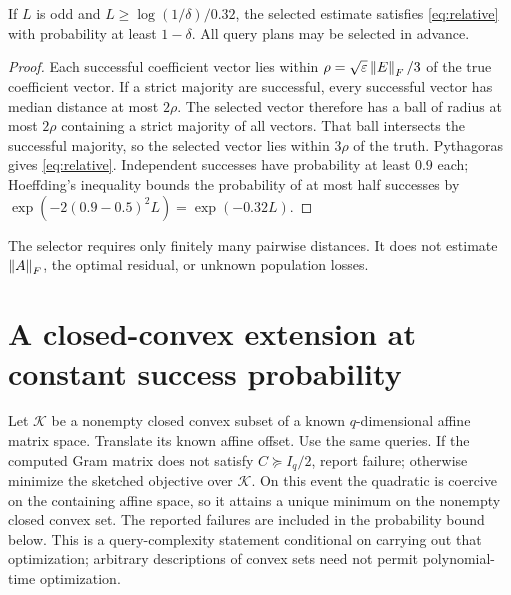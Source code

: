 \documentclass[11pt]{article}
\begin{document}
\begin{proposition}\label{prop:amplification}
If $L$ is odd and $L\ge\log(1/\delta)/0.32$, the selected estimate satisfies \eqref{eq:relative} with probability at least $1-\delta$. All query plans may be selected in advance.
\end{proposition}
\begin{proof}
Each successful coefficient vector lies within
$\rho=\sqrt{\varepsilon}\left\lVert E\right\rVert_F/3$ of the true coefficient vector. If a strict majority are successful, every successful vector has median distance at most $2\rho$. The selected vector therefore has a ball of radius at most $2\rho$ containing a strict majority of all vectors. That ball intersects the successful majority, so the selected vector lies within $3\rho$ of the truth. Pythagoras gives \eqref{eq:relative}. Independent successes have probability at least $0.9$ each; Hoeffding's inequality bounds the probability of at most half successes by $\exp(-2(0.9-0.5)^2L)=\exp(-0.32L)$.
\end{proof}

The selector requires only finitely many pairwise distances. It does not estimate $\left\lVert A\right\rVert_F$, the optimal residual, or unknown population losses.

\section{A closed-convex extension at constant success probability}
Let $\mathcal K$ be a nonempty closed convex subset of a known $q$-dimensional affine matrix space. Translate its known affine offset. Use the same queries. If the computed Gram matrix does not satisfy $C\succeq I_q/2$, report failure; otherwise minimize the sketched objective over $\mathcal K$. On this event the quadratic is coercive on the containing affine space, so it attains a unique minimum on the nonempty closed convex set. The reported failures are included in the probability bound below. This is a query-complexity statement conditional on carrying out that optimization; arbitrary descriptions of convex sets need not permit polynomial-time optimization.
\end{document}
